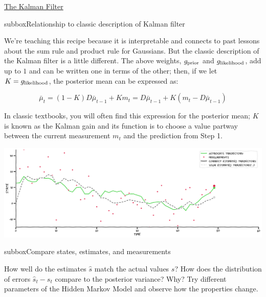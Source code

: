 \begin{textbox}{\href{http://instructor.compneuro.neuromatch.io/tutorials/W3D2_HiddenDynamics/instructor/W3D2_Tutorial3.html}{The Kalman Filter }   }

\begin{subbox}{subbox}{Relationship to classic description of Kalman filter}
\scriptsize

We're teaching this recipe because it is interpretable and connects to past lessons about the sum rule and product rule for Gaussians. But the classic description of the Kalman filter is a little different. The above weights, $g_{\rm{prior}}$ and $g_{\rm{likelihood}}$, add up to $1$ and can be written one in terms of the other; then, if we let $K = g_{\rm{likelihood}}$, the posterior mean can be expressed as:

\begin{equation}
\bar{\mu}_t = (1-K) D\bar{\mu}_{t-1} + K m_t = D\bar{\mu}_{t-1} + K (m_t - D\bar{\mu}_{t-1})
\end{equation}

In classic textbooks, you will often find this expression for the posterior mean; $K$ is known as the Kalman gain and its function is to choose a value partway between the current measurement $m_t$ and the prediction from Step 1.


\begin{center}
    
\includegraphics[scale=0.17]{Figures/HD/HD_Figure7.png}
\end{center}

\end{subbox}
\begin{subbox}{subbox}{Compare states, estimates, and measurements}
\scriptsize

How well do the estimates $\hat{s}$ match the actual values $s$? How does the distribution of errors $\hat{s}_t - s_t$ compare to the posterior variance? Why? Try different parameters of the Hidden Markov Model and observe how the properties change.


\end{subbox}
\end{textbox}
